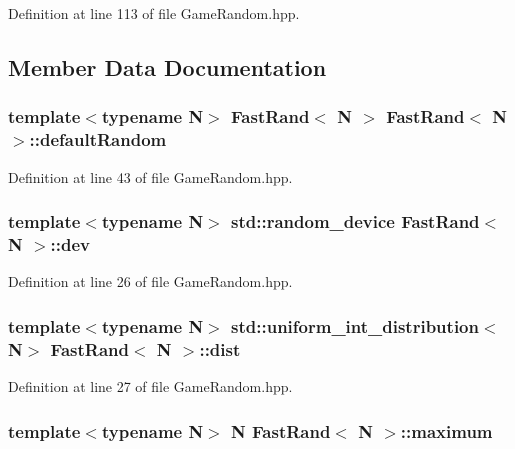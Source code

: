 Definition at line 113 of file Game\-Random.\-hpp.



\subsection{Member Data Documentation}
\hypertarget{class_fast_rand_ae6756973a197860a27487b65dee1fad0}{
\subsubsection[{default\-Random}]{\setlength{\rightskip}{0pt plus 5cm}template$<$typename N$>$ {\bf Fast\-Rand}$<$ N $>$ {\bf Fast\-Rand}$<$ N $>$\-::default\-Random\hspace{0.3cm}{\ttfamily [static]}}}\label{class_fast_rand_ae6756973a197860a27487b65dee1fad0}


Definition at line 43 of file Game\-Random.\-hpp.

\hypertarget{class_fast_rand_a101185e54f4a2a60a3179a8524c3b8a9}{
\subsubsection[{dev}]{\setlength{\rightskip}{0pt plus 5cm}template$<$typename N$>$ std\-::random\-\_\-device {\bf Fast\-Rand}$<$ N $>$\-::dev\hspace{0.3cm}{\ttfamily [protected]}}}\label{class_fast_rand_a101185e54f4a2a60a3179a8524c3b8a9}


Definition at line 26 of file Game\-Random.\-hpp.

\hypertarget{class_fast_rand_a0b39a2388a6512acb59dfba2c9f19ace}{
\subsubsection[{dist}]{\setlength{\rightskip}{0pt plus 5cm}template$<$typename N$>$ std\-::uniform\-\_\-int\-\_\-distribution$<$N$>$ {\bf Fast\-Rand}$<$ N $>$\-::dist\hspace{0.3cm}{\ttfamily [protected]}}}\label{class_fast_rand_a0b39a2388a6512acb59dfba2c9f19ace}


Definition at line 27 of file Game\-Random.\-hpp.

\hypertarget{class_fast_rand_aaee674d6363b30ae014073e23e3b2746}{
\subsubsection[{maximum}]{\setlength{\rightskip}{0pt plus 5cm}template$<$typename N$>$ N {\bf Fast\-Rand}$<$ N $>$\-::maximum\hspace{0.3cm}{\ttfamily [protected]}}}\label{class_fast_rand_aaee674d6363b30ae014073e23e3b2746}


